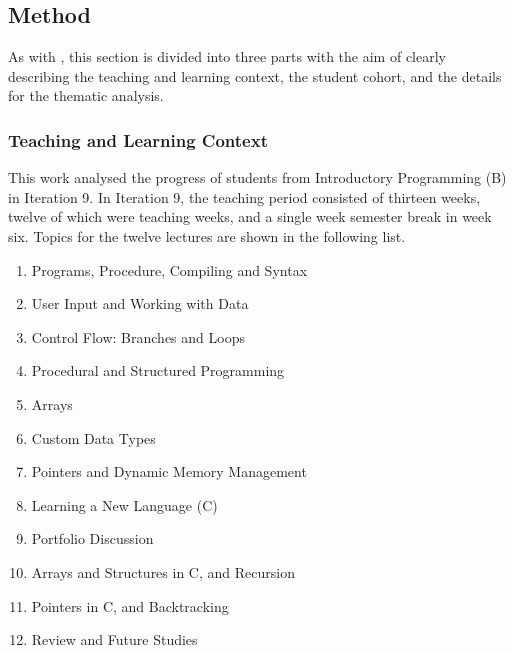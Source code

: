 


\subsection{Method} %
\label{sec:progress_method}

As with , this section is divided into three parts with the aim of clearly describing the teaching and learning context, the student cohort, and the details for the thematic analysis.

\subsubsection{Teaching and Learning Context} %
\label{sub:progress_teaching_and_learning_context}

This work analysed the progress of students from Introductory Programming (B) in Iteration 9. In Iteration 9, the teaching period consisted of thirteen weeks, twelve of which were teaching weeks, and a single week semester break in week six. Topics for the twelve lectures are shown in the following list.

\begin{enumerate}
  \item Programs, Procedure, Compiling and Syntax
  \item User Input and Working with Data
  \item Control Flow: Branches and Loops
  \item Procedural and Structured Programming
  \item Arrays
  \item Custom Data Types
  \item Pointers and Dynamic Memory Management
  \item Learning a New Language  (C)
  \item Portfolio Discussion
  \item Arrays and Structures in C, and Recursion
  \item Pointers in C, and Backtracking
  \item Review and Future Studies
\end{enumerate}


